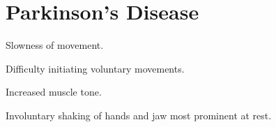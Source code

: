 \begin{coloredlist}
\begin{coloredlist}
\begin{coloredlist}
\end{coloredlist}

\label{parkinson}
\section{Parkinson's Disease}
\begin{coloredlist}
    \item {}
    \begin{coloredlist}
        \item Slowness of movement.
    \end{coloredlist}
    \item {}
    \begin{coloredlist}
        \item Difficulty initiating voluntary movements.
    \end{coloredlist}
    \item {}
    \begin{coloredlist}
        \item Increased muscle tone.
    \end{coloredlist}
    \item {}
    \begin{coloredlist}
        \item Involuntary shaking of hands and jaw most prominent at rest.
    \end{coloredlist}
\end{coloredlist}


